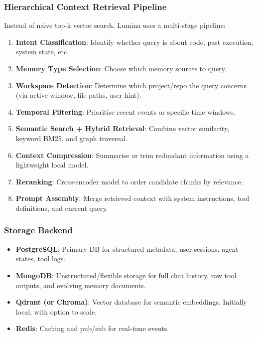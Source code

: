\documentclass[12pt,a4paper]{article}
\begin{document}
\subsubsection{Hierarchical Context Retrieval Pipeline}
Instead of naive top‑k vector search, Lumina uses a multi‑stage pipeline:

\begin{enumerate}[leftmargin=*]
    \item \textbf{Intent Classification}: Identify whether query is about code, past execution, system state, etc.
    \item \textbf{Memory Type Selection}: Choose which memory sources to query.
    \item \textbf{Workspace Detection}: Determine which project/repo the query concerns (via active window, file paths, user hint).
    \item \textbf{Temporal Filtering}: Prioritise recent events or specific time windows.
    \item \textbf{Semantic Search + Hybrid Retrieval}: Combine vector similarity, keyword BM25, and graph traversal.
    \item \textbf{Context Compression}: Summarise or trim redundant information using a lightweight local model.
    \item \textbf{Reranking}: Cross‑encoder model to order candidate chunks by relevance.
    \item \textbf{Prompt Assembly}: Merge retrieved context with system instructions, tool definitions, and current query.
\end{enumerate}

\subsubsection{Storage Backend}
\begin{itemize}[leftmargin=*]
    \item \textbf{PostgreSQL}: Primary DB for structured metadata, user sessions, agent states, tool logs.
    \item \textbf{MongoDB}: Unstructured/flexible storage for full chat history, raw tool outputs, and evolving memory documents.
    \item \textbf{Qdrant (or Chroma)}: Vector database for semantic embeddings. Initially local, with option to scale.
    \item \textbf{Redis}: Caching and pub/sub for real‑time events.
\end{itemize}
\end{document}
